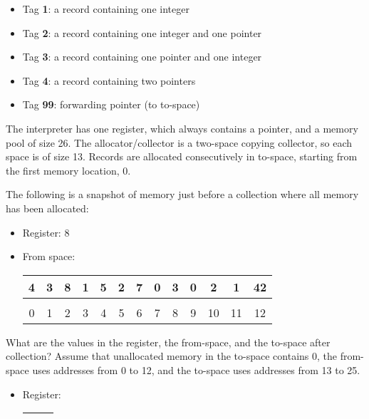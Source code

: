 \begin{enumerate}
  \begin{itemize}
  \item Tag \textbf{1}: a record containing one integer
  \item Tag \textbf{2}: a record containing one integer and one pointer
  \item Tag \textbf{3}: a record containing one pointer and one integer
  \item Tag \textbf{4}: a record containing two pointers
  \item Tag \textbf{99}: forwarding pointer (to to-space)
  \end{itemize}

 The interpreter has one register, which always contains a pointer,
 and a memory pool of size 26. The allocator/collector is a two-space
 copying collector, so each space is of size 13. Records are allocated
 consecutively in to-space, starting from the first memory location,
 0.

 The following is a snapshot of memory just before a collection where
 all memory has been allocated:

 \begin{itemize}
 \item Register: 8
 \item From space:
 \begin{tabular}{|c|c|c|c|c|c|c|c|c|c|c|c|@{\hskip0pt}c@{\hskip0pt}|}
  \hline
  4&3&8&1&5&2&7&0&3&0&2&1&42\\
  \hline \multicolumn{1}{c}{}\\[-16pt]
  \multicolumn{1}{c}{\tiny 0}&
  \multicolumn{1}{c}{\tiny 1}&
  \multicolumn{1}{c}{\tiny 2}&
  \multicolumn{1}{c}{\tiny 3}&
  \multicolumn{1}{c}{\tiny 4}&
  \multicolumn{1}{c}{\tiny 5}&
  \multicolumn{1}{c}{\tiny 6}&
  \multicolumn{1}{c}{\tiny 7}&
  \multicolumn{1}{c}{\tiny 8}&
  \multicolumn{1}{c}{\tiny 9}&
  \multicolumn{1}{c}{\tiny 10}&
  \multicolumn{1}{c}{\tiny 11}&
  \multicolumn{1}{c}{\tiny 12}
  \\
 \end{tabular}
 \end{itemize}

What are the values in the register, the from-space, and the to-space after collection?
Assume that unallocated memory in the to-space contains 0, the from-space uses
addresses from 0 to 12, and the to-space uses addresses from 13 to 25.

 \begin{itemize}
 \item Register: \\[10pt]
 {\Huge
 \begin{tabular}{|c|}
  \hline~~~\\ \hline
 \end{tabular}
 }


\end{itemize}
\end{enumerate}
